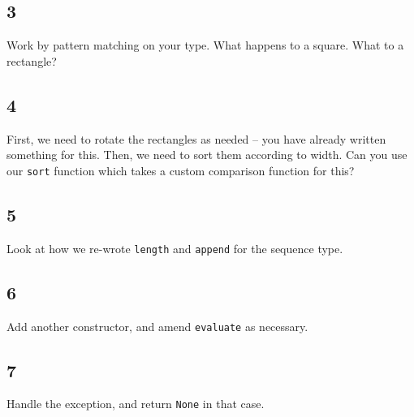 \documentclass[]{book}
\newcommand{\smspace}{\vspace{4mm}}
\begin{document}
\subsection*{3}
Work by pattern matching on your type. What happens to a square. What to a rectangle?

\subsection*{4}
First, we need to rotate the rectangles as needed -- you have already written something for this. Then, we need to sort them according to width. Can you use our \texttt{sort} function which takes a custom comparison function for this?

\subsection*{5}
Look at how we re-wrote \texttt{length} and \texttt{append} for the \textsf{sequence} type.

\subsection*{6}
Add another constructor, and amend \texttt{evaluate} as necessary.

\subsection*{7}
Handle the exception, and return \texttt{None} in that case.





\end{document}
